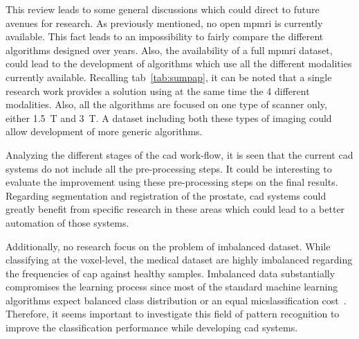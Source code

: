 This review leads to some general discussions which could direct to future avenues for research.
As previously mentioned, no open \ac{mpmri} is currently available.
This fact leads to an impossibility to fairly compare the different algorithms designed over years.
Also, the availability of a full \ac{mpmri} dataset, could lead to the development of algorithms which use all the different modalities currently available.
Recalling \acs{tab}~\ref{tab:sumpap}, it can be noted that a single research work provides a solution using at the same time the 4 different modalities.
Also, all the algorithms are focused on one type of scanner only, either \SI{1.5}{\tesla} and \SI{3}{\tesla}.
A dataset including both these types of imaging could allow development of more generic algorithms.

Analyzing the different stages of the \ac{cad} work-flow, it is seen that the current \ac{cad} systems do not include all the pre-processing steps.
It could be interesting to evaluate the improvement using these pre-processing steps on the final results.
Regarding segmentation and registration of the prostate, \ac{cad} systems could greatly benefit from specific research in these areas which could lead to a better automation of those systems.


Additionally, no research focus on the problem of imbalanced dataset.
While classifying at the voxel-level, the medical dataset are highly imbalanced regarding the frequencies of \ac{cap} against healthy samples.
Imbalanced data substantially compromises the learning process since most of the standard machine learning algorithms expect balanced class distribution or an equal micslassification cost~\cite{he2009learning}.
Therefore, it seems important to investigate this field of pattern recognition to improve the classification performance while developing \ac{cad} systems.


